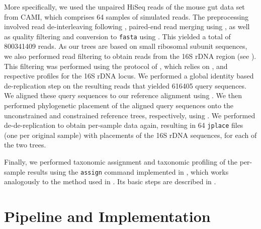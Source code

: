 More specifically, we used the unpaired HiSeq reads of the mouse gut data set from CAMI,
which comprises \num{64} samples of simulated reads.
The preprocessing involved read de-interleaving following \cite{DeinterleaveFastq},
paired-end read merging using  \citep{Zhang2014},
as well as quality filtering and conversion to \texttt{fasta} using  \citep{Rognes2016}.
This yielded a total of \num{800 341 409} reads.
As our trees are based on small ribosomal subunit sequences,
we also performed read filtering to obtain reads from the 16S rDNA region
(see ).
This filtering was performed using the protocol of \cite{Logares2014},
which relies on  \citep{Eddy1998,Eddy2009}, and respective profiles for the 16S rDNA locus.
We performed a global identity based de-replication step on the resulting reads that yielded \num{616 405} query sequences.
We aligned these query sequences to our  reference alignment
using  \citep{Berger2011a,Berger2012}.
We then performed phylogenetic placement of the aligned query sequences onto the unconstrained and constrained reference trees,
respectively, using  \citep{Barbera2018}.
We performed de-de-replication to obtain per-sample data again, %
resulting in \num{64} \texttt{jplace} files (one per original sample) with placements of the 16S rDNA sequences,
for each of the two trees.


Finally, we performed taxonomic assignment and taxonomic profiling of the per-sample results
using the \texttt{assign} command implemented in ,
which works analogously to the method used in  \citep{Kozlov2016}.
Its basic steps are described in .



\cleardoublepage

\chapter{Pipeline and Implementation}
\label{ch:PipelineImplementation}


